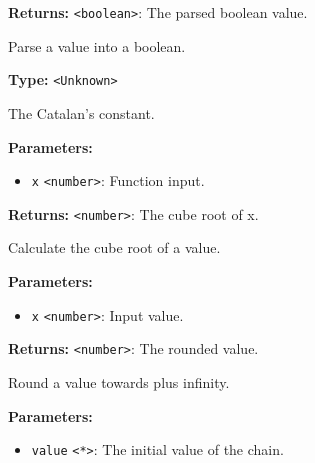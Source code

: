 \documentclass[12pt,a4paper]{article}
\begin{document}
\noindent \textbf{Returns:} \texttt{<boolean>}: The parsed boolean value.

\noindent Parse a value into a boolean.

\vspace{5mm}
\noindent {}\vspace{4mm}


\noindent \textbf{Type:} \texttt{<Unknown>}

\noindent The Catalan's constant.

\vspace{5mm}
\noindent {}


\noindent \textbf{Parameters:}
\begin{itemize}
  \item \texttt{x} \texttt{<number>}: Function input.
\end{itemize}

\noindent \textbf{Returns:} \texttt{<number>}: The cube root of \textasciigrave{}x\textasciigrave{}.

\noindent Calculate the cube root of a value.

\vspace{5mm}
\noindent {}


\noindent \textbf{Parameters:}
\begin{itemize}
  \item \texttt{x} \texttt{<number>}: Input value.
\end{itemize}

\noindent \textbf{Returns:} \texttt{<number>}: The rounded value.

\noindent Round a value towards plus infinity.

\vspace{5mm}
\noindent {}


\noindent \textbf{Parameters:}
\begin{itemize}
  \item \texttt{value} \texttt{<*>}: The initial value of the chain.
\end{itemize}
\end{document}
